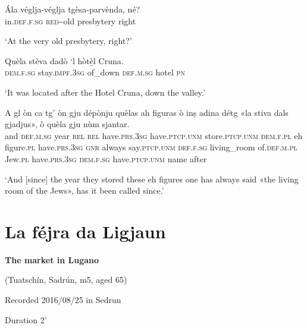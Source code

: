 \begin{linenumbers}
\gll  Ála véglja-véglja tgèsa-parvènda, né?  \\
 in.\textsc{def.f.sg} \textsc{red}\textasciitilde{old} presbytery right\\
\end{linenumbers}
\medskip
\glt `At the very old presbytery, right?'
\medskip

\begin{linenumbers}
\gll  Quèla stèva dadò `l hòtè̱l Cruna.  \\
 \textsc{dem.f.sg} stay.\textsc{impf.3sg} of\_down \textsc{def.m.sg} hotel \textsc{pn}\\
\end{linenumbers} 
\glt `It was located after the Hotel Cruna, down the valley.'
\medskip

\begin{linenumbers}
\gll A gl òn ca tg’ òn gju dépònju quèlas ah figuras ò inṣ adina détg «la stiva dals gjadjus», ò quèla gju nùm sjantar.   \\
and \textsc{def.m.sg} year \textsc{rel} \textsc{rel} have.\textsc{prs.3sg} have.\textsc{ptcp.unm} store.\textsc{ptcp.unm} \textsc{dem.f.pl} eh figure.\textsc{pl} have.\textsc{prs.3sg} \textsc{gnr} always say.\textsc{ptcp.unm} \textsc{def.f.sg} living\_room of.\textsc{def.m.pl} Jew.\textsc{pl} have.\textsc{prs.3sg} \textsc{dem.f.sg} have.\textsc{ptcp.unm} name after\\
\end{linenumbers}
\medskip
\glt `And [since] the year they stored these eh figures one has always said «the living room of the Jews», has it been called since.'
\clearpage

\section{La féjra da Ligjaun}\label{sec:8.9}

\noindent
\textbf{The market in Lugano}

\noindent
(Tuatschín, Sadrún, m5, aged 65)

\noindent
Recorded 2016/08/25 in Sedrun

\noindent
Duration 2'

\bigskip

